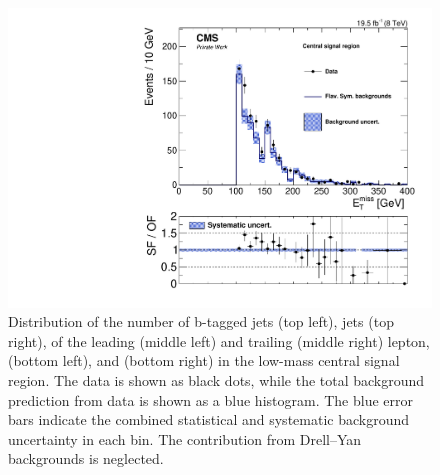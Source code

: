 \begin{figure}[htbp]
\begin{minipage}[t]{0.49\textwidth}
\end{minipage}
\begin{minipage}[t]{0.49\textwidth}
\includegraphics[width=\textwidth]{plots/results/rSFOFDependencies/rSFOFDependency_SignalCentral_MET_Full2012_SF_lowMass.pdf}
\end{minipage}
\caption{Distribution of the number of b-tagged jets (top left), jets (top right), \pt of the leading (middle left) and trailing (middle right) lepton, \HT (bottom left), and \MET (bottom right) in the low-mass central signal region. The data is shown as black dots, while the total background prediction from data is shown as a blue histogram. The blue error bars indicate the combined statistical and systematic background uncertainty in each bin. The contribution from Drell--Yan backgrounds is neglected.}
\label{fig:dependencies}
\end{figure}


